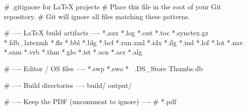 # .gitignore for LaTeX projects
# Place this file in the root of your Git repository.
# Git will ignore all files matching these patterns.

# ---- LaTeX build artifacts ----
*.aux
*.log
*.out
*.toc
*.synctex.gz
*.fdb_latexmk
*.fls
*.bbl
*.blg
*.bcf
*.run.xml
*.idx
*.ilg
*.ind
*.lof
*.lot
*.nav
*.snm
*.vrb
*.thm
*.glo
*.ist
*.acn
*.acr
*.alg

# ---- Editor / OS files ----
*.swp
*.swo
*~
.DS_Store
Thumbs.db

# ---- Build directories ----
build/
output/

# ---- Keep the PDF (uncomment to ignore) ----
# *.pdf
